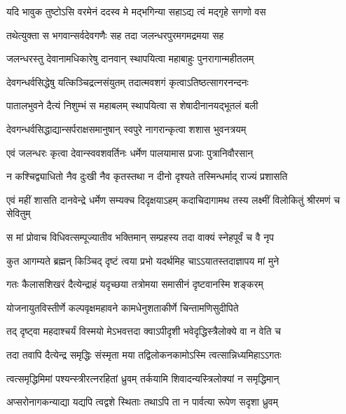 \twolineshloka
{यदि भावुक तुष्टोऽसि वरमेनं ददस्व मे}
{मद्भगिन्या सहाऽद्य त्वं मद्गृहे सगणो वस} %


\twolineshloka
{तथेत्युक्ता स भगवान्सर्वदेवगणैः सह}
{तदा जलन्धरपुरमगमद्रमया सह} %

\twolineshloka
{जलन्धरस्तु देवानामधिकारेषु दानवान्}
{स्थापयित्वा महाबाहुः पुनरागान्महीतलम्} %

\twolineshloka
{देवगन्धर्वसिद्धेषु यत्किञ्चिद्रत्नसंयुतम्}
{तदात्मवशगं कृत्वाऽतिष्ठत्सागरनन्दनः} %

\twolineshloka
{पातालभुवने दैत्यं निशुम्भं स महाबलम्}
{स्थापयित्वा स शेषादीनानयद्भूतलं बली} %

\twolineshloka
{देवगन्धर्वसिद्धाद्यान्सर्पराक्षसमानुषान्}
{स्वपुरे नागरान्कृत्वा शशास भुवनत्रयम्} %

\twolineshloka
{एवं जलन्धरः कृत्वा देवान्स्ववशवर्तिनः}
{धर्मेण पालयामास प्रजाः पुत्रानिवौरसान्} %

\twolineshloka
{न कश्चिद्व्याधितो नैव दुःखी नैव कृतस्तथा}
{न दीनो दृश्यते तस्मिन्धर्माद् राज्यं प्रशासति} %

\fourlineindentedshloka
{एवं महीं शासति दानवेन्द्रे}
{धर्मेण सम्यक्च दिदृक्षयाऽहम्}
{कदाचिदागामथ तस्य लक्ष्मीं}
{विलोकितुं श्रीरमणं च सेवितुम्} %





\twolineshloka
{स मां प्रोवाच विधिवत्सम्पूज्यातीव भक्तिमान्}
{सम्प्रहस्य तदा वाक्यं स्नेहपूर्वं च वै नृप} %

\twolineshloka
{कुत आगम्यते ब्रह्मन् किञ्चिद् दृष्टं त्वया प्रभो}
{यदर्थमिह चाऽऽयातस्तदाज्ञापय मां मुने} %


\twolineshloka
{गतः कैलासशिखरं दैत्येन्द्राहं यदृच्छया}
{तत्रोमया समासीनं दृष्टवानस्मि शङ्करम्} %

\twolineshloka
{योजनायुतविस्तीर्णे कल्पवृक्षमहावने}
{कामधेनुशताकीर्णे चिन्तामणिसुदीपिते} %

\twolineshloka
{तद् दृष्ट्वा महदाश्चर्यं विस्मयो मेऽभवत्तदा}
{क्वाऽपीदृशी भवेदृद्धिस्त्रैलोक्ये वा न वेति च} %

\twolineshloka
{तदा तवापि दैत्येन्द्र समृद्धिः संस्मृता मया}
{तद्विलोकनकामोऽस्मि त्वत्सान्निध्यमिहाऽऽगतः} %

\twolineshloka
{त्वत्समृद्धिमिमां पश्यन्स्त्रीरत्नरहितां ध्रुवम्}
{तर्कयामि शिवादन्यस्त्रिलोक्यां न समृद्धिमान्} %

\twolineshloka
{अप्सरोनागकन्याद्या यद्यपि त्वद्वशे स्थिताः}
{तथाऽपि ता न पार्वत्या रूपेण सदृशा ध्रुवम्} %

